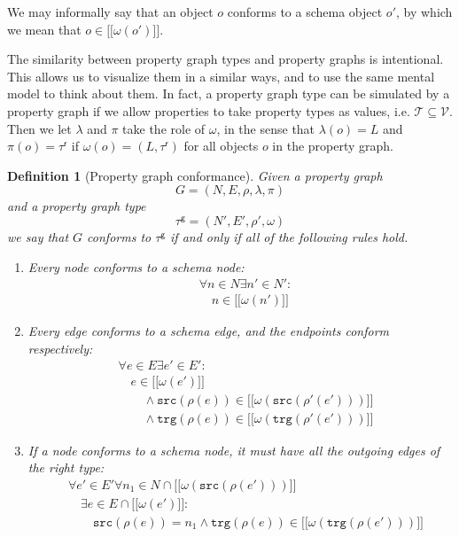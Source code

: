 \documentclass[a4paper]{article}
\newtheorem{definition}[theorem]{Definition}
\newcommand{\src}{\mathtt{src}}
\newcommand{\trg}{\mathtt{trg}}
\newcommand{\ptypes}{\mathcal{T}}
\newcommand{\rtype}{\tau^\mathsf{r}}
\newcommand{\gtype}{\tau^\mathsf{g}}
\newcommand{\lsem}{\ensuremath{[\![}}
\newcommand{\rsem}{\ensuremath{]\!]}}
\newcommand{\sem}[1]{\ensuremath{\lsem #1 \rsem}}
\begin{document}
We may informally say that an object $o$ conforms to a schema object $o'$, by which we mean that $o \in \sem{\omega(o')}$.

The similarity between property graph types and property graphs is intentional. This allows us to visualize them in a similar ways, and to use the same mental model to think about them. In fact, a property graph type can be simulated by a property graph if we allow properties to take property types as values, i.e. $\ptypes \subseteq \mathcal{V}$. Then we let $\lambda$ and $\pi$ take the role of $\omega$, in the sense that $\lambda(o) = L$ and $\pi(o) = \rtype$ if $\omega(o) = (L, \rtype)$ for all objects $o$ in the property graph.

\begin{definition}[Property graph conformance]
  Given a property graph $$G = (N, E, \rho, \lambda, \pi)$$ and a property graph type $$\gtype = (N', E', \rho', \omega)$$ we say that $G$ \emph{conforms} to $\gtype$ if and only if all of the following rules hold.

  \begin{enumerate}
    \item Every node conforms to a schema node:
    \begin{align*}
      &\forall n \in N \exists n' \in N' :\\
      &\quad n \in \sem{\omega(n')}
    \end{align*}
    
    \item Every edge conforms to a schema edge, and the endpoints conform respectively:
    \begin{align*}
      &\forall e \in E \exists e' \in E' :\\
      &\quad e \in \sem{\omega(e')}\\
      &\quad\quad\wedge \src(\rho(e)) \in \sem{\omega(\src(\rho'(e')))}\\
      &\quad\quad\wedge \trg(\rho(e)) \in \sem{\omega(\trg(\rho'(e')))}
    \end{align*}
    
    \item If a node conforms to a schema node, it must have all the outgoing edges of the right type:
    \begin{align*}
      &\forall e' \in E' \forall n_1 \in N \cap \sem{\omega(\src(\rho(e')))}\\
      &\quad\exists e \in E \cap \sem{\omega(e')} :\\
      &\quad\quad \src(\rho(e)) = n_1 \wedge \trg(\rho(e)) \in \sem{\omega(\trg(\rho(e')))}
    \end{align*}


\end{enumerate}
\end{definition}
\end{document}
